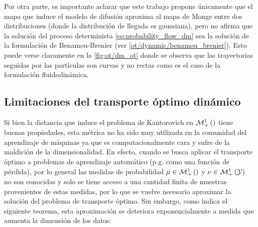 Por otra parte, es importante aclarar que este trabajo propone únicamente que el mapa que induce el modelo de difusión aproxima al mapa de Monge entre dos distribuciones (donde la distribución de llegada es gaussiana), pero no afirma que la solución del proceso determinista \eqref{eq:probability_flow_dm} sea la solución de la formulación de Benamou-Brenier (ver \autoref{ot/dynamic/benamou_brenier}). Esto puede verse claramente en la \autoref{fig:ot/dm_ot} donde se observa que las trayectorias seguidas por las partículas son curvas y no rectas como es el caso de la formulación fluidodinámica.



\subsection{Limitaciones del transporte óptimo dinámico}

Si bien la distancia que induce el problema de Kantorovich en $\mathcal{M}_+^1\left(\right)$ tiene buenas propiedades, esta métrica no ha sido muy utilizada en la comunidad del aprendizaje de máquinas ya que es computacionalmente cara y sufre de la maldición de la dimensionalidad. En efecto, cuando se busca aplicar el transporte óptimo a problemas de aprendizaje automático (p.g. como una función de pérdida), por lo general las medidas de probabilidad $\mu\in\mathcal{M}_+^1\left(\right)$ y $\nu\in\mathcal{M}_+^1\left(\mathcal{Y}\right)$ no son conocidas y solo se tiene acceso a una cantidad finita de muestras provenientes de estas medidas, por lo que se vuelve necesario aproximar la solución del problema de transporte óptimo. Sin embargo, como indica el siguiente teorema, esta aproximación se deteriora exponencialmente a medida que aumenta la dimensión de los datos:

